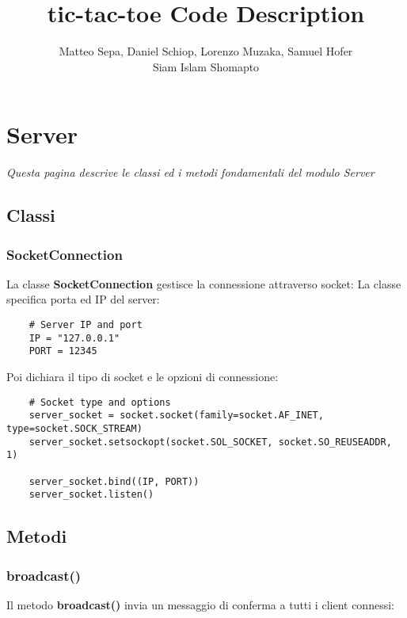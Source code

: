 \documentclass{article}
\title{tic-tac-toe Code Description}
\date{}
\author{Matteo Sepa, Daniel Schiop, Lorenzo Muzaka, Samuel Hofer \\ Siam Islam Shomapto}
\begin{document}
\maketitle
{}

\newpage
\tableofcontents
\newpage
{}

\section{Server}
\emph{Questa pagina descrive le classi ed i metodi fondamentali del modulo Server}

\subsection{Classi}
\subsubsection{SocketConnection}
La classe \textbf{SocketConnection} gestisce la connessione attraverso socket:\newline\newline
La classe specifica porta ed IP del server:

\begin{verbatim}
    # Server IP and port
    IP = "127.0.0.1"
    PORT = 12345
\end{verbatim}
Poi dichiara il tipo di socket e le opzioni di connessione:

\begin{verbatim}
    # Socket type and options
    server_socket = socket.socket(family=socket.AF_INET, type=socket.SOCK_STREAM)
    server_socket.setsockopt(socket.SOL_SOCKET, socket.SO_REUSEADDR, 1)

    server_socket.bind((IP, PORT))
    server_socket.listen()
\end{verbatim}

\newpage
\subsection{Metodi}

\subsubsection{broadcast()}
Il metodo \textbf{broadcast()} invia un messaggio di conferma a tutti i client connessi:
\end{document}
